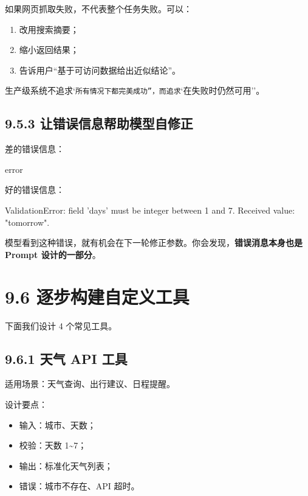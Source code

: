 如果网页抓取失败，不代表整个任务失败。可以：


\begin{enumerate}[leftmargin=2em]
\item 改用搜索摘要；
\item 缩小返回结果；
\item 告诉用户``基于可访问数据给出近似结论''。
\end{enumerate}

生产级系统不追求`\texttt{所有情况下都完美成功''，而追求}`在失败时仍然可用''。


\subsection{9.5.3 让错误信息帮助模型自修正}

差的错误信息：


\begin{codeblock}
error
\end{codeblock}

好的错误信息：


\begin{codeblock}
ValidationError: field 'days' must be integer between 1 and 7. Received value: "tomorrow".
\end{codeblock}

模型看到这种错误，就有机会在下一轮修正参数。你会发现，\textbf{错误消息本身也是 Prompt 设计的一部分}。


\section{9.6 逐步构建自定义工具}

下面我们设计 4 个常见工具。


\subsection{9.6.1 天气 API 工具}

适用场景：天气查询、出行建议、日程提醒。


设计要点：


\begin{itemize}[leftmargin=2em]
\item 输入：城市、天数；
\item 校验：天数 1\textasciitilde{}7；
\item 输出：标准化天气列表；
\item 错误：城市不存在、API 超时。
\end{itemize}

